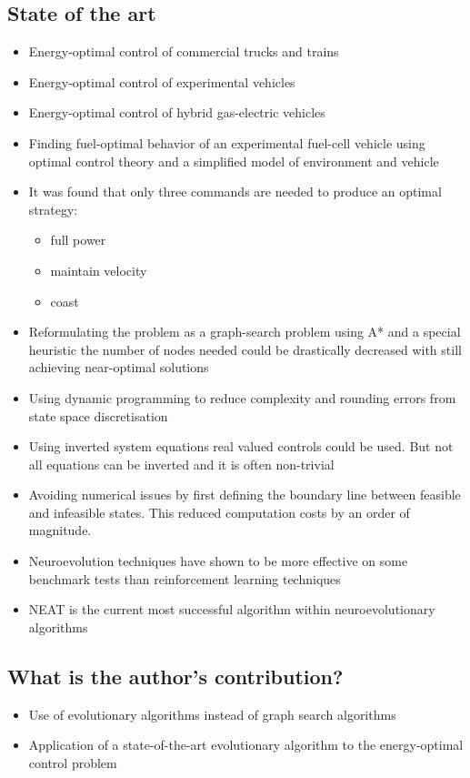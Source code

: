 \documentclass[paper=a4, fontsize=11pt]{scrartcl} %
\numberwithin{equation}{section} %
\numberwithin{figure}{section} %
\numberwithin{table}{section} %
\begin{document}
\subsection{State of the art}
\begin{itemize}
	\item Energy-optimal control of commercial trucks and trains
	\item Energy-optimal control of experimental vehicles
	\item Energy-optimal control of hybrid gas-electric vehicles
	\item Finding fuel-optimal behavior of an experimental fuel-cell vehicle using optimal control theory and a simplified model of environment and vehicle
	\item It was found that only three commands are needed to produce an optimal strategy:
	\begin{itemize}
		\item full power
		\item maintain velocity
		\item coast
	\end{itemize}
	\item Reformulating the problem as a graph-search problem using A* and a special heuristic the number of nodes needed could be drastically decreased with still achieving near-optimal solutions
	\item Using dynamic programming to reduce complexity and rounding errors from state space discretisation
	\item Using inverted system equations real valued controls could be used. But not all equations can be inverted and it is often non-trivial
	\item Avoiding numerical issues by first defining the boundary line between feasible and infeasible states. This reduced computation costs by an order of magnitude.
	\item Neuroevolution techniques have shown to be more effective on some benchmark tests than reinforcement learning techniques
	\item NEAT is the current most successful algorithm within neuroevolutionary algorithms
\end{itemize}

\subsection{What is the author's contribution?}
\begin{itemize}
	\item Use of evolutionary algorithms instead of graph search algorithms
	\item Application of a state-of-the-art evolutionary algorithm to the energy-optimal control problem
\end{itemize}
\end{document}
